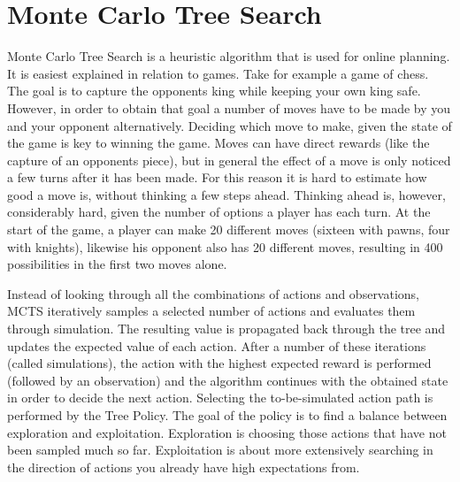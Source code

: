 \section{Monte Carlo Tree Search}

Monte Carlo Tree Search is a heuristic algorithm that is used for online planning. It is easiest explained in relation to games. Take for example a game of chess. The goal is to capture the opponents king while keeping your own king safe. However, in order to obtain that goal a number of moves have to be made by you and your opponent alternatively. Deciding which move to make, given the state of the game is key to winning the game. Moves can have direct rewards (like the capture of an opponents piece), but in general the effect of a move is only noticed a few turns after it has been made. For this reason it is hard to estimate how good a move is, without thinking a few steps ahead. Thinking ahead is, however, considerably hard, given the number of options a player has each turn. At the start of the game, a player can make 20 different moves (sixteen with pawns, four with knights), likewise his opponent also has 20 different moves, resulting in 400 possibilities in the first two moves alone. %

Instead of looking through all the combinations of actions and observations, MCTS iteratively samples a selected number of actions and evaluates them through simulation. The resulting value is propagated back through the tree and updates the expected value of each action. After a number of these iterations (called simulations), the action with the highest expected reward is performed (followed by an observation) and the algorithm continues with the obtained state in order to decide the next action. Selecting the to-be-simulated action path is performed by the Tree Policy. The goal of the policy is to find a balance between exploration and exploitation. Exploration is choosing those actions that have not been sampled much so far. Exploitation is about more extensively searching in the direction of actions you already have high expectations from. 